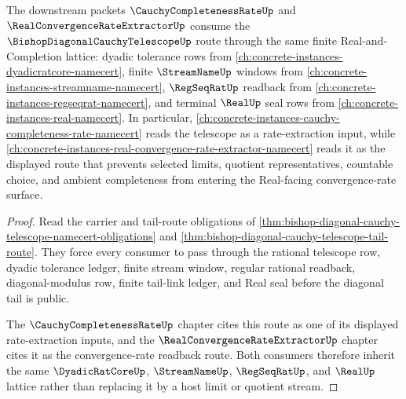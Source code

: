 \begin{theorem}
\label{thm:bishop-diagonal-cauchy-telescope-completion-consumer-lattice-link}
The downstream packets $\CauchyCompletenessRateUp$ and $\RealConvergenceRateExtractorUp$ consume the $\BishopDiagonalCauchyTelescopeUp$ route through the same finite Real-and-Completion lattice: dyadic tolerance rows from \autoref{ch:concrete-instances-dyadicratcore-namecert}, finite $\StreamNameUp$ windows from \autoref{ch:concrete-instances-streamname-namecert}, $\RegSeqRatUp$ readback from \autoref{ch:concrete-instances-regseqrat-namecert}, and terminal $\RealUp$ seal rows from \autoref{ch:concrete-instances-real-namecert}. In particular, \autoref{ch:concrete-instances-cauchy-completeness-rate-namecert} reads the telescope as a rate-extraction input, while \autoref{ch:concrete-instances-real-convergence-rate-extractor-namecert} reads it as the displayed route that prevents selected limits, quotient representatives, countable choice, and ambient completeness from entering the Real-facing convergence-rate surface.
\end{theorem}
\begin{proof}
Read the carrier and tail-route obligations of \autoref{thm:bishop-diagonal-cauchy-telescope-namecert-obligations} and \autoref{thm:bishop-diagonal-cauchy-telescope-tail-route}. They force every consumer to pass through the rational telescope row, dyadic tolerance ledger, finite stream window, regular rational readback, diagonal-modulus row, finite tail-link ledger, and Real seal before the diagonal tail is public.

The $\CauchyCompletenessRateUp$ chapter cites this route as one of its displayed rate-extraction inputs, and the $\RealConvergenceRateExtractorUp$ chapter cites it as the convergence-rate readback route. Both consumers therefore inherit the same $\DyadicRatCoreUp$, $\StreamNameUp$, $\RegSeqRatUp$, and $\RealUp$ lattice rather than replacing it by a host limit or quotient stream.
\end{proof}

